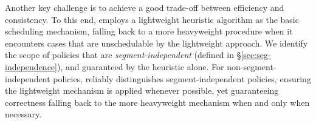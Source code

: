 Another key challenge is to achieve a good trade-off between efficiency and consistency.
To this end, \name employs a lightweight heuristic
algorithm as the basic scheduling mechanism, falling back to a more
heavyweight procedure when it encounters cases that are unschedulable
by the lightweight approach.
We identify the scope of policies that are {\em segment-independent} 
(defined in \S\ref{sec:seg-independence}),
and guaranteed by the heuristic alone.
For non-segment-independent policies, 
\name reliably distinguishes
segment-independent policies, ensuring the lightweight mechanism is
applied whenever possible, yet guaranteeing correctness falling back
to the more heavyweight mechanism when and only when necessary.

